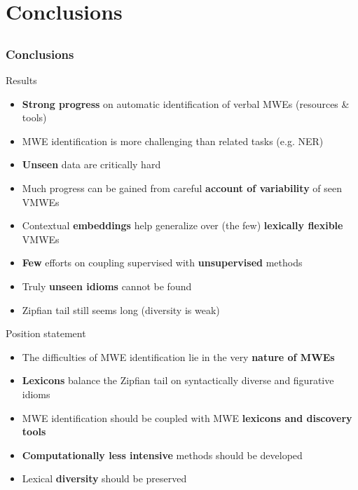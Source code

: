 \documentclass[xcolor=dvipsnames]{beamer}
\begin{document}
\begin{frame}
\begin{scriptsize}
\end{scriptsize}

\end{frame}


\section{Conclusions}  
\subsection{}

\begin{frame}
   \frametitle{Conclusions}

\begin{scriptsize}
\begin{block}{Results}
\begin{itemize}
\item \textbf{Strong progress} on automatic identification of verbal MWEs (resources \& tools)
\item MWE identification is more challenging than related tasks (e.g. NER)
\item \textbf{Unseen} data are critically hard
\item Much progress can be gained from careful \textbf{account of variability} of seen VMWEs
\item Contextual \textbf{embeddings} help generalize over (the few) \textbf{lexically flexible} VMWEs
\item \textbf{Few} efforts on coupling supervised with \textbf{unsupervised} methods
\item Truly \textbf{unseen idioms} cannot be found
\item Zipfian tail still seems long (diversity is weak)
\end{itemize}
\end{block}

\begin{block}{Position statement}
\begin{itemize}
\item The difficulties of MWE identification lie in the very \textbf{nature of MWEs}
\item \textbf{Lexicons} balance the Zipfian tail on syntactically diverse and figurative idioms
\item MWE identification should be coupled with MWE \textbf{lexicons and discovery tools}
\item \textbf{Computationally less intensive} methods should be developed
\item Lexical \textbf{diversity} should be preserved
\end{itemize}
\end{block}

\end{scriptsize}

\end{frame}
\end{document}
